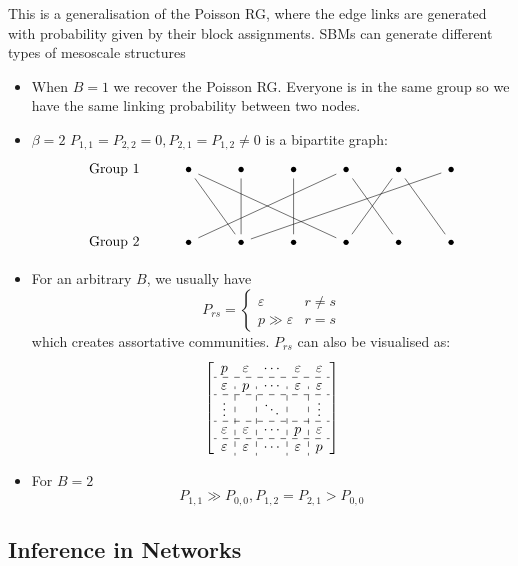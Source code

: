 \documentclass[12pt]{article}
\theoremstyle{definition}
\begin{document}
This is a generalisation of the Poisson RG, where the edge links are generated with probability given by their block assignments. SBMs can generate different types of mesoscale structures
\begin{itemize}
    \item When $B=1$ we recover the  Poisson RG. Everyone is in the same group so we have the same linking probability between two nodes. 
    \item $\beta=2$ $P_{1,1}=P_{2,2}=0, P_{2,1} = P_{1,2}\neq0$ is a bipartite graph: 
    \[\begin{tikzcd}
	{\mathrm{Group}\ 1} & \bullet & \bullet & \bullet & \bullet & \bullet & \bullet \\
	\\
	{\mathrm{Group}\ 2} & \bullet & \bullet & \bullet & \bullet & \bullet & \bullet
	\arrow[no head, from=1-2, to=3-3]
	\arrow[no head, from=1-2, to=3-5]
	\arrow[no head, from=1-3, to=3-3]
	\arrow[no head, from=1-6, to=3-7]
	\arrow[no head, from=1-7, to=3-3]
	\arrow[no head, from=3-2, to=1-5]
	\arrow[no head, from=3-4, to=1-4]
	\arrow[no head, from=3-5, to=1-6]
	\arrow[no head, from=3-6, to=1-5]
\end{tikzcd}\]

    \item For an arbitrary $B$, we usually have 
    \[ P_{rs} = \begin{cases}
        \varepsilon & r\neq s\\
        p\gg \varepsilon & r = s
    \end{cases}
    \]
    which creates assortative communities. $P_{rs}$ can also be visualised as: 
    \[
        \left[\begin{array}{c:c:c:c:c}
        p&\varepsilon  & \cdots&\varepsilon & \varepsilon \\
        \hdashline
        \varepsilon&p  & \cdots&\varepsilon & \varepsilon \\
        \hdashline
        \vdots&&\ddots&&\vdots\\
        \hdashline
        \varepsilon &\varepsilon  & \cdots& p&\varepsilon \\
        \hdashline
        \varepsilon&\varepsilon & \cdots&\varepsilon & p
        \end{array}\right]
    \]
    \item For $B=2$
    \[
    P_{1,1}\gg P_{0,0}, P_{1,2}=P_{2,1}>P_{0,0}
    \]
\end{itemize}

\subsection{Inference in Networks}
\end{document}
